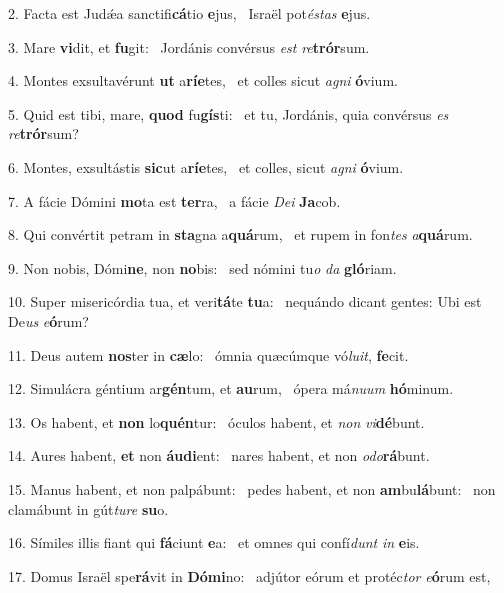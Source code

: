 2. Facta est Judǽa sanctifi\textbf{cá}tio \textbf{e}jus, \ast\  Israël pot\textit{és}\textit{tas} \textbf{e}jus.\

3. Mare \textbf{vi}dit, et \textbf{fu}git: \ast\  Jordánis convérsus \textit{est} \textit{re}\textbf{trór}sum.\

4. Montes exsultavérunt \textbf{ut} a\textbf{rí}\textbf{e}tes, \ast\  et colles sicut \textit{a}\textit{gni} \textbf{ó}vium.\

5. Quid est tibi, mare, \textbf{quod} fu\textbf{gís}ti: \ast\  et tu, Jordánis, quia convérsus \textit{es} \textit{re}\textbf{trór}sum?\

6. Montes, exsultástis \textbf{sic}ut a\textbf{rí}\textbf{e}tes, \ast\  et colles, sicut \textit{a}\textit{gni} \textbf{ó}vium.\

7. A fácie Dómini \textbf{mo}ta est \textbf{ter}ra, \ast\  a fácie \textit{De}\textit{i} \textbf{Ja}cob.\

8. Qui convértit petram in \textbf{sta}gna a\textbf{quá}rum, \ast\  et rupem in fon\textit{tes} \textit{a}\textbf{quá}rum.\

9. Non nobis, Dómi\textbf{ne}, non \textbf{no}bis: \ast\  sed nómini tu\textit{o} \textit{da} \textbf{gló}riam.\

10. Super misericórdia tua, et veri\textbf{tá}te \textbf{tu}a: \ast\  nequándo dicant gentes: Ubi est De\textit{us} \textit{e}\textbf{ó}rum?\

11. Deus autem \textbf{nos}ter in \textbf{cæ}lo: \ast\  ómnia quæcúmque vó\textit{lu}\textit{it}, \textbf{fe}cit.\

12. Simulácra géntium ar\textbf{gén}tum, et \textbf{au}rum, \ast\  ópera má\textit{nu}\textit{um} \textbf{hó}minum.\

13. Os habent, et \textbf{non} lo\textbf{quén}tur: \ast\  óculos habent, et \textit{non} \textit{vi}\textbf{dé}bunt.\

14. Aures habent, \textbf{et} non \textbf{áu}\textbf{di}ent: \ast\  nares habent, et non \textit{o}\textit{do}\textbf{rá}bunt.\

15. Manus habent, et non palpábunt: \dag\  pedes habent, et non \textbf{am}bu\textbf{lá}bunt: \ast\  non clamábunt in gút\textit{tu}\textit{re} \textbf{su}o.\

16. Símiles illis fiant qui \textbf{fá}ciunt \textbf{e}a: \ast\  et omnes qui confí\textit{dunt} \textit{in} \textbf{e}is.\

17. Domus Israël spe\textbf{rá}vit in \textbf{Dó}\textbf{mi}no: \ast\  adjútor eórum et protéc\textit{tor} \textit{e}\textbf{ó}rum est,\

